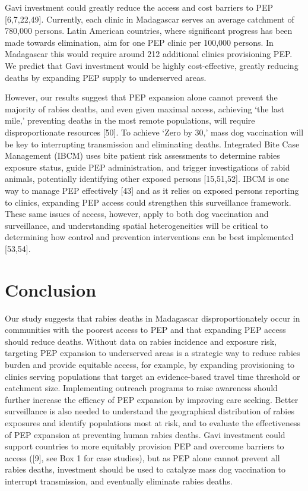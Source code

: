 \documentclass[
]{book}
\begin{document}
Gavi investment could greatly reduce the access and cost barriers to PEP
{[}6,7,22,49{]}. Currently, each clinic in Madagascar serves an average
catchment of 780,000 persons. Latin American countries, where
significant progress has been made towards elimination, aim for one PEP
clinic per 100,000 persons. In Madagascar this would require around 212
additional clinics provisioning PEP. We predict that Gavi investment
would be highly cost-effective, greatly reducing deaths by expanding PEP
supply to underserved areas.

However, our results suggest that PEP expansion alone cannot prevent the
majority of rabies deaths, and even given maximal access, achieving `the
last mile,' preventing deaths in the most remote populations, will
require disproportionate resources {[}50{]}. To achieve `Zero by 30,' mass
dog vaccination will be key to interrupting transmission and eliminating
deaths. Integrated Bite Case Management (IBCM) uses bite patient risk
assessments to determine rabies exposure status, guide PEP
administration, and trigger investigations of rabid animals, potentially
identifying other exposed persons {[}15,51,52{]}. IBCM is one way to
manage PEP effectively {[}43{]} and as it relies on exposed persons
reporting to clinics, expanding PEP access could strengthen this
surveillance framework. These same issues of access, however, apply to
both dog vaccination and surveillance, and understanding spatial
heterogeneities will be critical to determining how control and
prevention interventions can be best implemented {[}53,54{]}.

\hypertarget{conclusion}{%
\section{Conclusion}\label{conclusion}}

Our study suggests that rabies deaths in Madagascar disproportionately
occur in communities with the poorest access to PEP and that expanding
PEP access should reduce deaths. Without data on rabies incidence and
exposure risk, targeting PEP expansion to underserved areas is a
strategic way to reduce rabies burden and provide equitable access, for
example, by expanding provisioning to clinics serving populations that
target an evidence-based travel time threshold or catchment size.
Implementing outreach programs to raise awareness should further
increase the efficacy of PEP expansion by improving care seeking. Better
surveillance is also needed to understand the geographical distribution
of rabies exposures and identify populations most at risk, and to
evaluate the effectiveness of PEP expansion at preventing human rabies
deaths. Gavi investment could support countries to more equitably
provision PEP and overcome barriers to access ({[}9{]}, see Box 1 for case
studies), but as PEP alone cannot prevent all rabies deaths, investment
should be used to catalyze mass dog vaccination to interrupt
transmission, and eventually eliminate rabies deaths.
\end{document}
